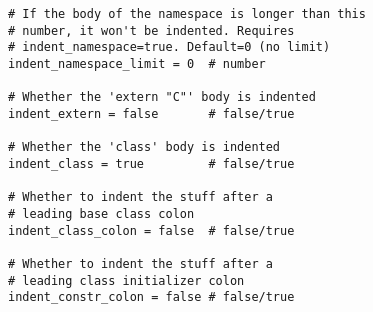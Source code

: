 \begin{lstlisting}[caption={Trecho do Arquivo de Configuração de
\textit{Uncrustify}},label={lst:uncrustifySettingSample}]
# If the body of the namespace is longer than this
# number, it won't be indented. Requires
# indent_namespace=true. Default=0 (no limit)
indent_namespace_limit = 0  # number

# Whether the 'extern "C"' body is indented
indent_extern = false       # false/true

# Whether the 'class' body is indented
indent_class = true         # false/true

# Whether to indent the stuff after a
# leading base class colon
indent_class_colon = false  # false/true

# Whether to indent the stuff after a
# leading class initializer colon
indent_constr_colon = false # false/true
\end{lstlisting}

